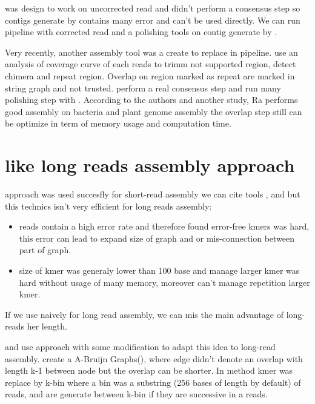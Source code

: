 \documentclass[main]{subfiles}
\begin{document}
\miniasm was design to work on uncorrected read and didn't perform a consensus step so contigs generate by \miniasm contains many error and can't be used directly. We can run \minimap \miniasm pipeline with corrected read and a polishing tools on contig generate by \miniasm. 

Very recently, another assembly tool \cite{Ra} was a create to replace \miniasm in \minimap \miniasm pipeline.  use an analysis of coverage curve of each reads to trimm not supported region, detect chimera and repeat region. Overlap on region marked as repeat are marked in string graph and not trusted.  perform a real consensus step and run many polishing step with . According to the authors and another study\cite{long_read_assembler_comparison}, Ra performs good assembly on bacteria and plant genome assembly the overlap step still can be optimize in term of memory usage and computation time.

\section{\DBG like long reads assembly approach} \label{section:sota:wtdbg}

\DBG approach was used succesfly for short-read assembly we can cite tools  \cite{spades},  \cite{minia} and \cite{megahit} but this technics isn't very efficient for long reads assembly:
\begin{itemize}
    \item reads contain a high error rate and therefore found error-free kmers was hard, this error can lead to expand size of graph and or mis-connection between part of graph.
    \item size of kmer was generaly lower than 100 base and manage larger kmer was hard without usage of many memory, moreover \DBG can't manage repetition larger kmer.
\end{itemize}

If we use \DBG naively for long read assembly, we can mis the main advantage of long-reads her length.

\flye and \wtdbg use \DBG approach with some modification to adapt this idea to long-read assembly. \flye create a A-Bruijn Graphs(), where edge didn't denote an overlap with length k-1 between node but the overlap can be shorter. In \wtdbg method kmer was replace by k-bin where a bin was a substring (256 bases of length by default) of reads, and are generate between k-bin if they are successive in a reads.
\end{document}
